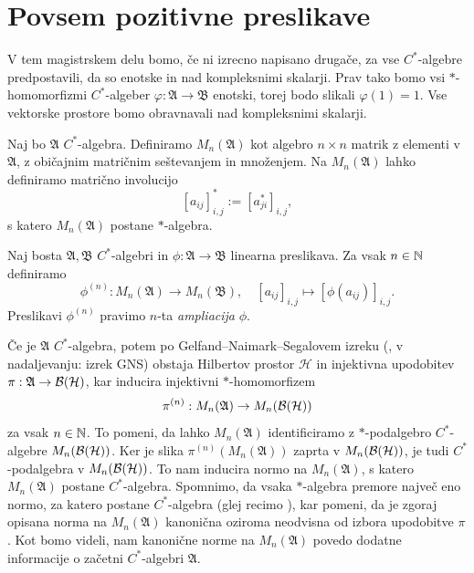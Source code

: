 

\section{Povsem pozitivne preslikave}\label{sec:2}

V tem magistrskem delu bomo, če ni izrecno napisano drugače,
za vse $C^*$-algebre predpostavili, da so enotske in nad kompleksnimi skalarji.
Prav tako bomo vsi $*$-homomorfizmi $C^*$-algeber $\varphi: \mathfrak{A} \to \mathfrak{B}$ enotski,
torej bodo slikali $\varphi(1) = 1$. Vse vektorske prostore bomo obravnavali nad kompleksnimi skalarji. 

Naj bo $\mathfrak{A}$ $C^*$-algebra. Definiramo $M_n (\mathfrak{A})$ kot algebro $n \times n$ matrik z elementi v $\mathfrak{A}$, z običajnim matričnim seštevanjem in množenjem.
Na $M_n(\mathfrak{A})$ lahko definiramo matrično involucijo
$$[a_{ij}]_{i, j} ^* := [a_{ji} ^*]_{i, j},$$
s katero $M_n (\mathfrak{A})$ postane $*$-algebra.

\begin{definicija}
    Naj bosta $\mathfrak{A}, \mathfrak{B}$ $C^*$-algebri in $\phi: \mathfrak{A} \to \mathfrak{B}$ linearna preslikava.
    Za vsak $n \in \mathbb N$ definiramo 
    $$\phi^{(n)}: M_n (\mathfrak{A}) \to M_n (\mathfrak{B}),\quad [a_{ij}]_{i, j} \mapsto [\phi(a_{ij})]_{i, j}.$$
    Preslikavi $\phi^{(n)}$ pravimo $n$-ta \emph{ampliacija} $\phi$.
\end{definicija}

Če je $\mathfrak{A}$ $C^*$-algebra, potem po Gelfand--Naimark--Segalovem izreku (\cite[Theorem VIII.5.14., str. 250]{conway1990}, v nadaljevanju: izrek GNS)
obstaja Hilbertov prostor $\mathcal{H}$ in injektivna upodobitev $\pi: \mathfrak{A} \to \operatorname{\mathcal{B} (\mathcal{H})}$, kar inducira injektivni $*$-homomorfizem 
$$\pi^{(n)}: M_n (\mathfrak{A}) \to M_n (\operatorname{\mathcal{B} (\mathcal{H})})$$
za vsak $n \in \mathbb N$. To pomeni, da lahko $M_n (\mathfrak{A})$ identificiramo z
$*$-podalgebro $C^*$-algebre $M_n (\operatorname{\mathcal{B} (\mathcal{H})})$.
Ker je slika $\pi^{(n)} (M_n (\mathfrak{A}))$ zaprta v $M_n (\operatorname{\mathcal{B} (\mathcal{H})})$,
je tudi $C^*$-podalgebra v $M_n (\operatorname{\mathcal{B} (\mathcal{H})})$.
To nam inducira normo na $M_n (\mathfrak{A})$, s katero $M_n (\mathfrak{A})$ postane $C^*$-algebra.
Spomnimo, da vsaka $*$-algebra premore največ eno normo, za katero postane $C^*$-algebra (glej recimo \cite[Corollary 2.1.2., str. 37]{murphy1990}),
kar pomeni, da je zgoraj opisana norma na $M_n (\mathfrak{A})$ kanonična oziroma neodvisna od izbora upodobitve $\pi$.
Kot bomo videli, nam kanonične norme na $M_n (\mathfrak{A})$ povedo dodatne informacije o začetni $C^*$-algebri $\mathfrak{A}$.

